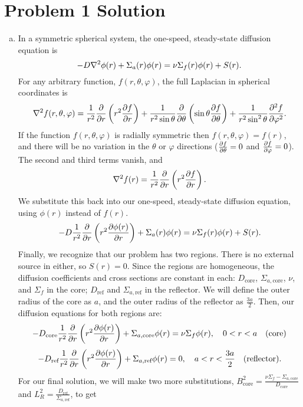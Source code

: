 \section*{Problem 1 Solution}

\begin{enumerate}[a)]

\item

In a symmetric spherical system, the one-speed, steady-state diffusion equation is
$$ -D \nabla^2 \phi(r) + \Sigma_a (r) \phi(r) = \nu \Sigma_f(r) \phi(r) + S(r) .$$
For any arbitrary function, $f(r,\theta,\varphi)$, the full Laplacian in spherical coordinates is
$$ \nabla^2 f(r,\theta,\varphi) = \frac{1}{r^2}\frac{\partial}{\partial r}\left(r^2 \frac{\partial f}{\partial r}\right) +  \frac{1}{r^2 \sin\theta} \frac{\partial}{\partial \theta}\left(\sin\theta \frac{\partial f}{\partial \theta}\right) + \frac{1}{r^2 \sin^2 \theta} \frac{\partial^2 f}{\partial \varphi^2} .$$
If the function $f(r,\theta,\varphi)$ is radially symmetric then $f(r,\theta,\varphi) = f(r)$, and there will be no variation in the $\theta$ or $\varphi$ directions ($\frac{\partial f}{\partial \theta} = 0$ and $\frac{\partial f}{\partial \varphi} = 0$).  The second and third terms vanish, and
$$ \nabla^2 f(r) = \frac{1}{r^2}\frac{\partial}{\partial r}\left(r^2 \frac{\partial f}{\partial r}\right) .$$
We substitute this back into our one-speed, steady-state diffusion equation, using $\phi(r)$ instead of $f(r)$.
$$ -D \frac{1}{r^2}\frac{\partial}{\partial r}\left(r^2 \frac{\partial \phi(r)}{\partial r}\right) + \Sigma_a (r) \phi(r) = \nu \Sigma_f(r) \phi(r) + S(r) .$$
Finally, we recognize that our problem has two regions.
There is no external source in either, so $S(r) = 0$.
    Since the regions are homogeneous, the diffusion coefficients and cross sections are constant in each: $D_{\text{core}}$, $\Sigma_{a,\text{core}}$, $\nu$, and $\Sigma_f$ in the core; $D_{\text{ref}}$ and $\Sigma_{a,\text{ref}}$ in the reflector.
We will define the outer radius of the core as $a$, and the outer radius of the reflector as $\frac{3a}{2}$.
Then, our diffusion equations for both regions are:
$$ -D_{\text{core}} \frac{1}{r^2}\frac{\partial}{\partial r}\left(r^2 \frac{\partial \phi(r)}{\partial r}\right) + \Sigma_{a, \text{core}} \phi(r) = \nu \Sigma_f \phi(r), \quad 0 < r < a \quad\text{(core)} $$
$$ -D_{\text{ref}} \frac{1}{r^2}\frac{\partial}{\partial r}\left(r^2 \frac{\partial \phi(r)}{\partial r}\right) + \Sigma_{a, \text{ref}}\phi(r) = 0, \quad a < r < \frac{3a}{2} \quad\text{(reflector)}.$$
For our final solution, we will make two more substitutions, $B_{\text{core}}^2 = \frac{\nu\Sigma_f - \Sigma_{a, \text{core}}}{D_{\text{core}}}$ and $L_R^2 = \frac{D_{\text{ref}}}{\Sigma_{a, \text{ref}}}$, to get

\end{enumerate}
